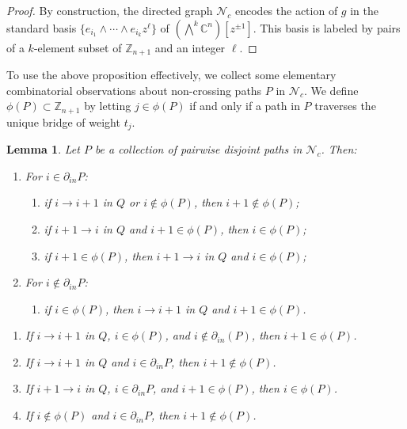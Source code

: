 \documentclass[12pt]{amsart}
\newcommand{\CC}{\mathbb{C}}
\newcommand{\ZZ}{\mathbb{Z}}
\newcommand{\cN}{\mathcal{N}} %
\newtheorem{lemma}[theorem]{Lemma}
\theoremstyle{remark}
\numberwithin{equation}{section}
\begin{document}
\begin{proof}
By construction, the directed graph $\cN_c$ encodes the action of $g$ in the standard basis $\{ e_{i_1} \wedge \cdots \wedge e_{i_k} z^\ell\}$ of $\left(\bigwedge^k \CC^n\right)[z^{\pm 1}]$. 
This basis is labeled by pairs of a $k$-element subset of $\ZZ_{n+1}$ and an integer $\ell$.
\end{proof}

To use the above proposition effectively, we collect some elementary combinatorial observations about non-crossing paths $P$ in $\cN_c$. 
We define $\phi(P) \subset \ZZ_{n+1}$ by letting $j \in \phi(P)$ if and only if a path in $P$ traverses the unique bridge of weight $t_j$.

\begin{lemma}\label{lem:phi}
  Let $P$ be a collection of pairwise disjoint paths in $\cN_c$.  Then:
  \begin{enumerate}
    \item For $i\in\partial_{in}P$:
    \begin{enumerate}
      \item if $i\to i+1$ in $Q$ or $i\notin\phi(P)$, then $i+1\notin\phi(P)$;
      \item if $i+1\to i$ in $Q$ and $i+1\in\phi(P)$, then $i\in\phi(P)$;
      \item[(b')] if  $i+1\in\phi(P)$, then $i+1\to i$ in $Q$ and $i\in\phi(P)$;
    \end{enumerate}
    \item For $i\notin\partial_{in}P$: 
    \begin{enumerate}
      \item if $i\in\phi(P)$, then $i\to i+1$ in $Q$ and $i+1\in\phi(P)$.\\
    \end{enumerate}
  \end{enumerate}
  \begin{enumerate}
    \item If $i \to i+1$ in $Q$, $i \in \phi(P)$, and $i \notin \partial_{in}(P)$, then $i + 1 \in \phi(P)$.
    \item If $i \to i+1$ in $Q$ and $i \in \partial_{in}P$, then $i +1 \notin \phi(P)$.
    \item If $i+1 \to i$ in $Q$, $i \in \partial_{in}P$, and $i+1 \in \phi(P)$, then $i \in \phi(P)$.
    \item If $i \notin \phi(P)$ and $i \in \partial_{in}P$, then $i +1 \notin \phi(P)$.
  \end{enumerate}
\end{lemma}
\end{document}
